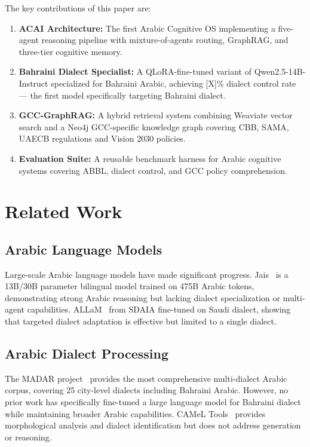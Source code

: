 \documentclass[11pt]{article}
\begin{document}
The key contributions of this paper are:
\begin{enumerate}
  \item \textbf{ACAI Architecture:} The first Arabic Cognitive OS implementing
        a five-agent reasoning pipeline with mixture-of-agents routing,
        GraphRAG, and three-tier cognitive memory.
  \item \textbf{Bahraini Dialect Specialist:} A QLoRA-fine-tuned variant of
        Qwen2.5-14B-Instruct specialized for Bahraini Arabic, achieving
        [X]\% dialect control rate — the first model specifically targeting
        Bahraini dialect.
  \item \textbf{GCC-GraphRAG:} A hybrid retrieval system combining
        Weaviate vector search and a Neo4j GCC-specific knowledge graph
        covering CBB, SAMA, UAECB regulations and Vision 2030 policies.
  \item \textbf{Evaluation Suite:} A reusable benchmark harness for Arabic
        cognitive systems covering ABBL, dialect control, and GCC policy
        comprehension.
\end{enumerate}

\section{Related Work}

\subsection{Arabic Language Models}
Large-scale Arabic language models have made significant progress.
Jais~\cite{jais2023} is a 13B/30B parameter bilingual model trained on
475B Arabic tokens, demonstrating strong Arabic reasoning but lacking
dialect specialization or multi-agent capabilities.
ALLaM~\cite{allam2024} from SDAIA fine-tuned on Saudi dialect, showing
that targeted dialect adaptation is effective but limited to a single dialect.

\subsection{Arabic Dialect Processing}
The MADAR project~\cite{madar2018} provides the most comprehensive
multi-dialect Arabic corpus, covering 25 city-level dialects including
Bahraini Arabic. However, no prior work has specifically fine-tuned a
large language model for Bahraini dialect while maintaining broader
Arabic capabilities.
CAMeL Tools~\cite{camel2021} provides morphological analysis and dialect
identification but does not address generation or reasoning.
\end{document}
